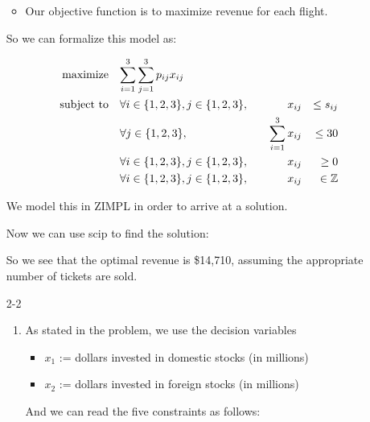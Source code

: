 \documentclass[12pt,letterpaper]{article}
\begin{document}
\begin{enumerate}
\begin{itemize}
        \item
          Our objective function is to maximize revenue for each flight.
      \end{itemize}

      So we can formalize this model as:

      \begin{alignat*}{4}
        \text{maximize}   \quad \mathrlap{\sum_{i = 1}^{3} \sum_{j = 1}^{3} p_{ij}x_{ij}}                                        \\
        \text{subject to} \quad & \forall i \in \{1, 2, 3\}, j \in \{1, 2, 3\}, \quad & x_{ij}                && \leq s_{ij}     \\
                                & \forall j \in \{1, 2, 3\},                    \quad & \sum_{i = 1}^3 x_{ij} && \leq 30         \\
                                & \forall i \in \{1, 2, 3\}, j \in \{1, 2, 3\}, \quad & x_{ij}                && \geq 0          \\
                                & \forall i \in \{1, 2, 3\}, j \in \{1, 2, 3\}, \quad & x_{ij}                && \in  \mathbb{Z} \\
      \end{alignat*}

      We model this in ZIMPL in order to arrive at a solution.

      

      Now we can use scip to find the solution:

      

      So we see that the optimal revenue is \$14,710,
      assuming the appropriate number of tickets are sold.
    \item [2-2]
      \begin{enumerate}
        \item

          As stated in the problem,
          we use the decision variables
          \begin{itemize}
            \item $x_1$ := dollars invested in domestic stocks (in millions)
            \item $x_2$ := dollars invested in foreign stocks (in millions)
          \end{itemize}

          And we can read the five constraints as follows:


\end{enumerate}
\end{enumerate}
\end{document}

